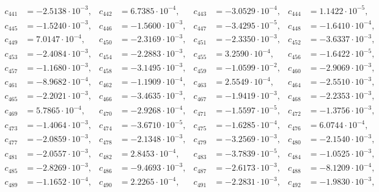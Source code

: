\begin{align*}
c_{ 441 } &= -2.5138 \cdot 10^{ -3 }, & c_{ 442 } &= 6.7385 \cdot 10^{ -4 }, & c_{ 443 } &= -3.0529 \cdot 10^{ -4 }, & c_{ 444 } &= 1.1422 \cdot 10^{ -5 },\\ 
c_{ 445 } &= -1.5240 \cdot 10^{ -3 }, & c_{ 446 } &= -1.5600 \cdot 10^{ -3 }, & c_{ 447 } &= -3.4295 \cdot 10^{ -5 }, & c_{ 448 } &= -1.6410 \cdot 10^{ -4 },\\ 
c_{ 449 } &= 7.0147 \cdot 10^{ -4 }, & c_{ 450 } &= -2.3169 \cdot 10^{ -3 }, & c_{ 451 } &= -2.3350 \cdot 10^{ -3 }, & c_{ 452 } &= -3.6337 \cdot 10^{ -3 },\\ 
c_{ 453 } &= -2.4084 \cdot 10^{ -3 }, & c_{ 454 } &= -2.2883 \cdot 10^{ -3 }, & c_{ 455 } &= 3.2590 \cdot 10^{ -4 }, & c_{ 456 } &= -1.6422 \cdot 10^{ -5 },\\ 
c_{ 457 } &= -1.1680 \cdot 10^{ -3 }, & c_{ 458 } &= -3.1495 \cdot 10^{ -3 }, & c_{ 459 } &= -1.0599 \cdot 10^{ -2 }, & c_{ 460 } &= -2.9069 \cdot 10^{ -3 },\\ 
c_{ 461 } &= -8.9682 \cdot 10^{ -4 }, & c_{ 462 } &= -1.1909 \cdot 10^{ -4 }, & c_{ 463 } &= 2.5549 \cdot 10^{ -4 }, & c_{ 464 } &= -2.5510 \cdot 10^{ -3 },\\ 
c_{ 465 } &= -2.2021 \cdot 10^{ -3 }, & c_{ 466 } &= -3.4635 \cdot 10^{ -3 }, & c_{ 467 } &= -1.9419 \cdot 10^{ -3 }, & c_{ 468 } &= -2.2353 \cdot 10^{ -3 },\\ 
c_{ 469 } &= 5.7865 \cdot 10^{ -4 }, & c_{ 470 } &= -2.9268 \cdot 10^{ -4 }, & c_{ 471 } &= -1.5597 \cdot 10^{ -5 }, & c_{ 472 } &= -1.3756 \cdot 10^{ -3 },\\ 
c_{ 473 } &= -1.4064 \cdot 10^{ -3 }, & c_{ 474 } &= -3.6710 \cdot 10^{ -5 }, & c_{ 475 } &= -1.6285 \cdot 10^{ -4 }, & c_{ 476 } &= 6.0744 \cdot 10^{ -4 },\\ 
c_{ 477 } &= -2.0859 \cdot 10^{ -3 }, & c_{ 478 } &= -2.1348 \cdot 10^{ -3 }, & c_{ 479 } &= -3.2569 \cdot 10^{ -3 }, & c_{ 480 } &= -2.1540 \cdot 10^{ -3 },\\ 
c_{ 481 } &= -2.0557 \cdot 10^{ -3 }, & c_{ 482 } &= 2.8453 \cdot 10^{ -4 }, & c_{ 483 } &= -3.7839 \cdot 10^{ -5 }, & c_{ 484 } &= -1.0525 \cdot 10^{ -3 },\\ 
c_{ 485 } &= -2.8269 \cdot 10^{ -3 }, & c_{ 486 } &= -9.4693 \cdot 10^{ -3 }, & c_{ 487 } &= -2.6173 \cdot 10^{ -3 }, & c_{ 488 } &= -8.1209 \cdot 10^{ -4 },\\ 
c_{ 489 } &= -1.1652 \cdot 10^{ -4 }, & c_{ 490 } &= 2.2265 \cdot 10^{ -4 }, & c_{ 491 } &= -2.2831 \cdot 10^{ -3 }, & c_{ 492 } &= -1.9830 \cdot 10^{ -3 },\\ 

\end{align*}
